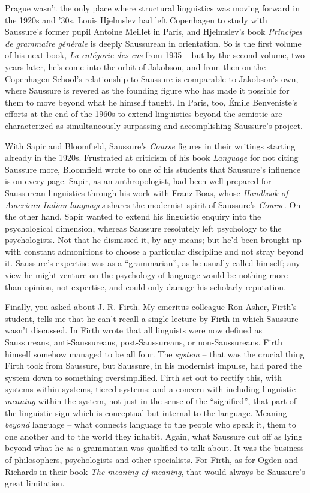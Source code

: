 \documentclass[output=paper]{langscibook}
\begin{document}
Prague wasn’t the only place where structural linguistics was moving forward in the 1920s and '30s. Louis Hjelmslev had left Copenhagen to study with Saussure’s former pupil Antoine Meillet in Paris, and Hjelmslev's \citeyear{Hjelmslev1928} book \textit{Principes de grammaire générale} is deeply Saussurean in orientation. So is the first volume of his next book, \textit{La catégorie des cas} from 1935 – but by the second volume, two years later, he’s come into the orbit of Jakobson, and from then on the Copenhagen School’s relationship to Saussure is comparable to Jakobson’s own, where Saussure is revered as the founding figure who has made it possible for them to move beyond what he himself taught. In Paris, too, Émile Benveniste’s efforts at the end of the 1960s to extend linguistics beyond the semiotic are characterized as simultaneously surpassing and accomplishing Saussure’s project.

With Sapir and Bloomfield, Saussure’s \textit{Course} figures in their writings starting already in the 1920s. Frustrated at criticism of his book \textit{Language} for not citing Saussure more, Bloomfield wrote to one of his students that Saussure’s influence is on every page. Sapir, as an anthropologist, had been well prepared for Saussurean linguistics through his work with Franz Boas, whose \citeyear{boas1911a} \textit{Handbook of American Indian languages} shares the modernist spirit of Saussure’s \textit{Course}. On the other hand, Sapir wanted to extend his linguistic enquiry into the psychological dimension, whereas Saussure resolutely left psychology to the psychologists. Not that he dismissed it, by any means; but he’d been brought up with constant admonitions to choose a particular discipline and not stray beyond it. Saussure’s expertise was as a “grammarian”, as he usually called himself; any view he might venture on the psychology of language would be nothing more than opinion, not expertise, and could only damage his scholarly reputation. 

Finally, you asked about J. R. Firth. My emeritus colleague Ron Asher, Firth’s student, tells me that he can’t recall a single lecture by Firth in which Saussure wasn’t discussed. In \citeyear{firth1950a} Firth wrote that all linguists were now defined as Saussureans, anti-Saussureans, post-Saussureans, or non-Saussureans. Firth himself somehow managed to be all four. The \textit{system} – that was the crucial thing Firth took from Saussure, but Saussure, in his modernist impulse, had pared the system down to something oversimplified. Firth set out to rectify this, with systems within systems, tiered systems: and a concern with including linguistic \textit{meaning} within the system, not just in the sense of the “signified”, that part of the linguistic sign which is conceptual but internal to the language. Meaning \textit{beyond} language – what connects language to the people who speak it, them to one another and to the world they inhabit. Again, what Saussure cut off as lying beyond what he as a grammarian was qualified to talk about. It was the business of philosophers, psychologists and other specialists. For Firth, as for Ogden and Richards in their book \textit{The meaning of meaning}, that would always be Saussure’s great limitation.
\end{document}
